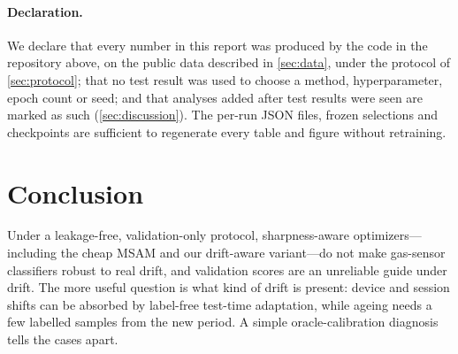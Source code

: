 \documentclass[10pt,twocolumn,letterpaper]{article}
\begin{document}
\paragraph{Declaration.} We declare that every number in this report was produced by the code in the repository
above, on the public data described in \cref{sec:data}, under the protocol of \cref{sec:protocol}; that no test
result was used to choose a method, hyperparameter, epoch count or seed; and that analyses added after test results
were seen are marked as such (\cref{sec:discussion}). The per-run JSON files, frozen selections and checkpoints are
sufficient to regenerate every table and figure without retraining.

\section{Conclusion}
\label{sec:conclusion}
Under a leakage-free, validation-only protocol, sharpness-aware optimizers---including the cheap MSAM and our
drift-aware variant---do not make gas-sensor classifiers robust to real drift, and validation scores are an
unreliable guide under drift. The more useful question is what kind of drift is present: device and session shifts
can be absorbed by label-free test-time adaptation, while ageing needs a few labelled samples from the new period. A
simple oracle-calibration diagnosis tells the cases apart.


{
    \small
    
    
}
\end{document}

